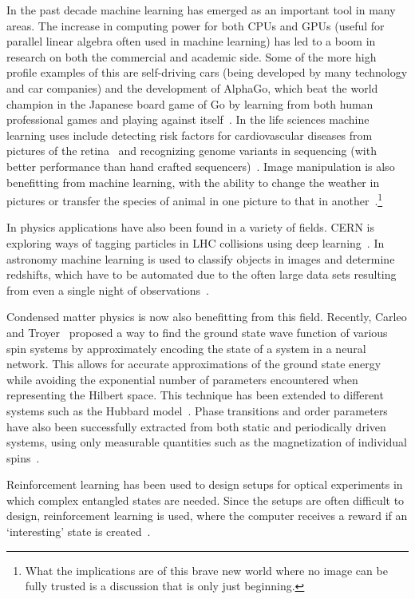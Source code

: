 \documentclass[11pt, a4paper]{report} %
\begin{document}
In the past decade machine learning has emerged as an important tool in many areas.
The increase in computing power for both CPUs and GPUs (useful for parallel linear algebra often used in machine learning) has led to a boom in research on both the commercial and academic side.
Some of the more high profile examples of this are self-driving cars (being developed by many technology and car companies) and the development of AlphaGo, which beat the world champion in the Japanese board game of Go by learning from both human professional games and playing against itself~\cite{Silver2017a,Silver2017}.
In the life sciences machine learning uses include detecting risk factors for cardiovascular diseases from pictures of the retina~\cite{poplin17_predic_cardiov_risk_factor_from} and recognizing genome variants in sequencing (with better performance than hand crafted sequencers)~\cite{Poplin2016}.
Image manipulation is also benefitting from machine learning, with the ability to change the weather in pictures or transfer the species of animal in one picture to that in another~\cite{Liu2017}.\footnote{What the implications are of this brave new world where no image can be fully trusted is a discussion that is only just beginning.}

In physics applications have also been found in a variety of fields.
CERN is exploring ways of tagging particles in LHC collisions using deep learning~\cite{paganini17_machin_learn_algor_jet_taggin}.
In astronomy machine learning is used to classify objects in images and determine redshifts, which have to be automated due to the often large data sets resulting from even a single night of observations~\cite{ball10_data_minin_and_machin_learn_in_astron}.

Condensed matter physics is now also benefitting from this field.
Recently, Carleo and Troyer~\cite{Carleo2017} proposed a way to find the ground state wave function of various spin systems by approximately encoding the state of a system in a neural network. This allows for accurate approximations of the ground state energy while avoiding the exponential number of parameters encountered when representing the Hilbert space.
This technique has been extended to different systems such as the Hubbard model~\cite{Saito2017}.
Phase transitions and order parameters have also been successfully extracted from both static and periodically driven systems, using only measurable quantities such as the magnetization of individual spins~\cite{Nieuwenburg2017}.

Reinforcement learning has been used to design setups for optical experiments in which complex entangled states are needed.
Since the setups are often difficult to design, reinforcement learning is used, where the computer receives a reward if an `interesting' state is created~\cite{dunjko17_machin_learn_artif_intel_quant_domain}.
\end{document}
